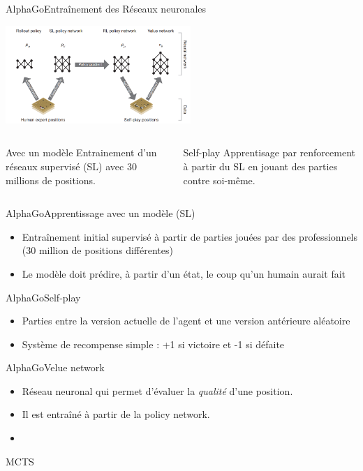 \begin{frame}{AlphaGo}{Entraînement des Réseaux neuronales}
	\begin{center}
		\includegraphics[width=7cm]{ressources/Entrainement}
		\begin{columns}[t]
			\begin{column}{.4\textwidth}
				\begin{block}{Avec un modèle}
					Entrainement d'un réseaux supervisé (SL) avec 30 millions de positions.
				\end{block}
			\end{column}
			\begin{column}{.4\textwidth}
				\begin{block}{Self-play}
					Apprentisage par renforcement à partir du SL en jouant des parties contre soi-même.
				\end{block}
			\end{column}
		\end{columns}

	\end{center}

\end{frame}


\begin{frame}{AlphaGo}{Apprentissage avec un modèle (SL)}

	\begin{itemize}
		\item Entraînement initial supervisé à partir de parties jouées par des professionnels (30 million de positions différentes)
		\item Le modèle doit prédire, à partir d'un état, le coup qu'un humain aurait fait
	\end{itemize}

\end{frame}


\begin{frame}{AlphaGo}{Self-play}

	\begin{itemize}
		\item Parties entre la version actuelle de l'agent et une version antérieure aléatoire
		\item Système de recompense simple : +1 si victoire et -1 si défaite
	\end{itemize}

\end{frame}


\begin{frame}{AlphaGo}{Velue network}
	\begin{itemize}
		\item Réseau neuronal qui permet d'évaluer la \textit{qualité} d'une position.
		\item Il est entraîné à partir de la policy network.
		\item
	\end{itemize}
\end{frame}


\begin{frame}{MCTS}

\end{frame}
